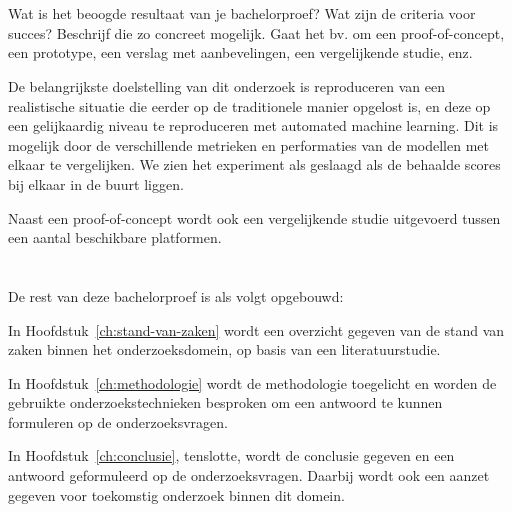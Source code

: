\section{}
\label{sec:onderzoeksdoelstelling}

Wat is het beoogde resultaat van je bachelorproef? Wat zijn de criteria voor succes? Beschrijf die zo concreet mogelijk. Gaat het bv. om een proof-of-concept, een prototype, een verslag met aanbevelingen, een vergelijkende studie, enz.

De belangrijkste doelstelling van dit onderzoek is reproduceren van een realistische situatie die eerder op de traditionele manier opgelost is, en deze op een gelijkaardig niveau te reproduceren met automated machine learning. Dit is mogelijk door de verschillende metrieken en performaties van de modellen met elkaar te vergelijken. We zien het experiment als geslaagd als de behaalde scores bij elkaar in de buurt liggen.

Naast een proof-of-concept wordt ook een vergelijkende studie uitgevoerd tussen een aantal beschikbare platformen.

\section{}
\label{sec:opzet-bachelorproef}


De rest van deze bachelorproef is als volgt opgebouwd:

In Hoofdstuk~\ref{ch:stand-van-zaken} wordt een overzicht gegeven van de stand van zaken binnen het onderzoeksdomein, op basis van een literatuurstudie.

In Hoofdstuk~\ref{ch:methodologie} wordt de methodologie toegelicht en worden de gebruikte onderzoekstechnieken besproken om een antwoord te kunnen formuleren op de onderzoeksvragen.


In Hoofdstuk~\ref{ch:conclusie}, tenslotte, wordt de conclusie gegeven en een antwoord geformuleerd op de onderzoeksvragen. Daarbij wordt ook een aanzet gegeven voor toekomstig onderzoek binnen dit domein.